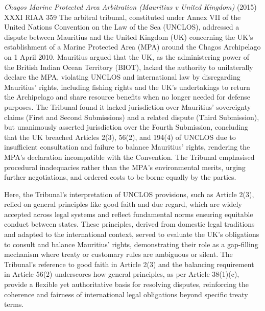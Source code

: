 \begin{casedetails}{\textit{Chagos Marine Protected Area Arbitration (Mauritius v United Kingdom)} (2015) XXXI RIAA 359}\label{case:Chagos Marine Protected Area Arbitration}
    \flushleft
    The arbitral tribunal, constituted under Annex VII of the United Nations Convention on the Law of the Sea (UNCLOS), addressed a dispute between Mauritius and the United Kingdom (UK) concerning the UK's establishment of a Marine Protected Area (MPA) around the Chagos Archipelago on 1 April 2010. Mauritius argued that the UK, as the administering power of the British Indian Ocean Territory (BIOT), lacked the authority to unilaterally declare the MPA, violating UNCLOS and international law by disregarding Mauritius' rights, including fishing rights and the UK's undertakings to return the Archipelago and share resource benefits when no longer needed for defense purposes. The Tribunal found it lacked jurisdiction over Mauritius' sovereignty claims (First and Second Submissions) and a related dispute (Third Submission), but unanimously asserted jurisdiction over the Fourth Submission, concluding that the UK breached Articles 2(3), 56(2), and 194(4) of UNCLOS due to insufficient consultation and failure to balance Mauritius' rights, rendering the MPA's declaration incompatible with the Convention. The Tribunal emphasised procedural inadequacies rather than the MPA's environmental merits, urging further negotiations, and ordered costs to be borne equally by the parties.

    \vspace{\baselineskip}

    Here, the Tribunal's interpretation of UNCLOS provisions, such as Article 2(3), relied on general principles like good faith and due regard, which are widely accepted across legal systems and reflect fundamental norms ensuring equitable conduct between states. These principles, derived from domestic legal traditions and adapted to the international context, served to evaluate the UK's obligations to consult and balance Mauritius' rights, demonstrating their role as a gap-filling mechanism where treaty or customary rules are ambiguous or silent. The Tribunal's reference to good faith in Article 2(3) and the balancing requirement in Article 56(2) underscores how general principles, as per Article 38(1)(c), provide a flexible yet authoritative basis for resolving disputes, reinforcing the coherence and fairness of international legal obligations beyond specific treaty terms.


\end{casedetails}
